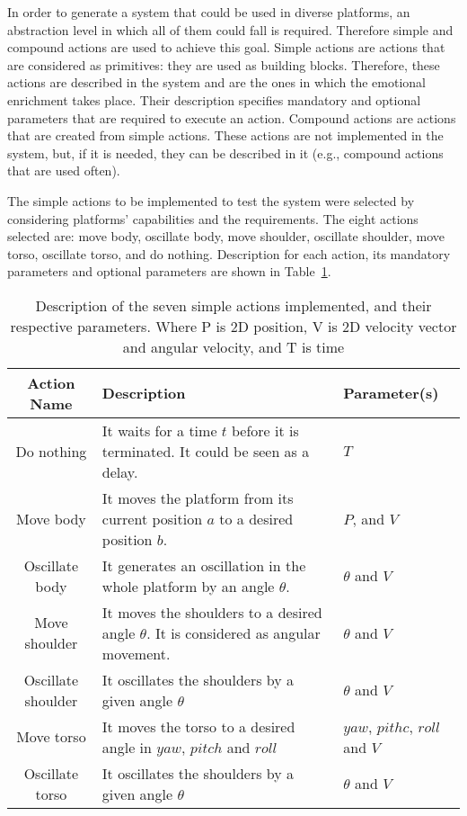 In order to generate a system that could be used in diverse platforms, an abstraction level in which all of them could fall is required. Therefore simple and compound actions are used to achieve this goal. Simple actions are actions that are considered as primitives: they are used as building blocks. Therefore, these actions are described in the system and are the ones in which the emotional enrichment takes place. Their description specifies mandatory and optional parameters that are required to execute an action. Compound actions are actions that are created from simple actions. These actions are not implemented in the system, but, if it is needed, they can be described in it (e.g., compound actions that are used often).

The simple actions to be implemented to test the system were selected by considering platforms' capabilities and the requirements. The eight actions selected are: move body, oscillate body, move shoulder, oscillate shoulder, move torso, oscillate torso, and do nothing. Description for each action, its mandatory parameters and optional parameters are shown in Table~\ref{table:actions_implemented}.

\begin{table}
\centering
\caption{Description of the seven simple actions implemented, and their respective parameters. Where  P is 2D position, V is 2D velocity vector and angular velocity, and T is time}
\label{table:actions_implemented}
\begin{tabular}{|c|p{3.9cm}|p{1.4cm}|}
\hline
\textbf{Action Name}& \textbf{Description} &\textbf{Parameter(s)} \\
\hline
Do nothing & It waits for a time $t$ before it is terminated. It could be seen as a delay.  & $T$\\
\hline
Move body & It moves the platform from its current position $a$ to a desired position $b$. & $P$, and $V$\\
\hline
Oscillate body & It generates an oscillation in the whole platform by an angle $\theta$. &  $\theta$ and $V$ \\
\hline
Move shoulder & It moves the shoulders to a desired angle $\theta$. It is considered as angular movement. & $\theta$ and $V$ \\
\hline
Oscillate shoulder & It oscillates the shoulders by a given angle $\theta$ & $\theta$ and $V$\\
\hline
Move torso & It moves the torso to a desired angle in $yaw$, $pitch$ and $roll$& $yaw$, $pithc$, $roll$ and $V$\\
\hline
Oscillate torso & It oscillates the shoulders by a given angle $\theta$ & $\theta$ and $V$\\  
\hline
\end{tabular}
\end{table}

